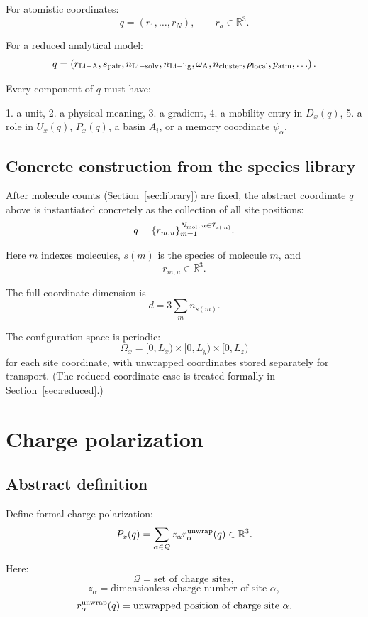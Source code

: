 \documentclass[11pt]{article}
\newcommand{\R}{\mathbb R}
\begin{document}
For atomistic coordinates:
\[
q=(r_1,\ldots,r_N),
\qquad
r_a\in\R^3.
\]

For a reduced analytical model:
\[
q=
\left(
r_{\rm Li-A},
s_{\rm pair},
n_{\rm Li-solv},
n_{\rm Li-lig},
\omega_{\rm A},
n_{\rm cluster},
\rho_{\rm local},
p_{\rm atm},
\ldots
\right).
\]

Every component of \(q\) must have:

1. a unit,
2. a physical meaning,
3. a gradient,
4. a mobility entry in \(D_x(q)\),
5. a role in \(U_x(q)\), \(P_x(q)\), a basin \(A_i\), or a memory coordinate
\(\psi_\alpha\).

\subsection{Concrete construction from the species library}

After molecule counts (Section~\ref{sec:library}) are fixed, the abstract
coordinate \(q\) above is instantiated concretely as the collection of all
site positions:
\[
q=
\{r_{m,u}\}_{m=1}^{N_{\rm mol},\,u\in\mathcal I_{s(m)}}.
\]

Here \(m\) indexes molecules, \(s(m)\) is the species of molecule \(m\), and
\[
r_{m,u}\in\mathbb R^3.
\]

The full coordinate dimension is
\[
d=3\sum_m n_{s(m)}.
\]

The configuration space is periodic:
\[
\Omega_x=
[0,L_x)\times[0,L_y)\times[0,L_z)
\]
for each site coordinate, with unwrapped coordinates stored separately for
transport. (The reduced-coordinate case is treated formally in
Section~\ref{sec:reduced}.)

\section{Charge polarization}
\label{sec:polarization}

\subsection{Abstract definition}

Define formal-charge polarization:
\[
P_x(q)=\sum_{\alpha\in\mathcal Q} z_\alpha r_\alpha^{\rm unwrap}(q)
\in\R^3.
\]

Here:
\[
\mathcal Q
=
\text{set of charge sites},
\]
\[
z_\alpha
=
\text{dimensionless charge number of site }\alpha,
\]
\[
r_\alpha^{\rm unwrap}(q)
=
\text{unwrapped position of charge site }\alpha.
\]
\end{document}
